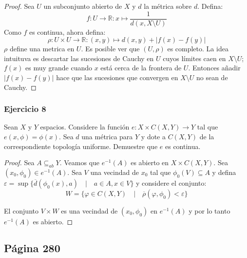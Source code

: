 \documentclass[letterpaper]{article}
\begin{document}
\begin{itemize}
\begin{proof}
Sea $U$ un subconjunto abierto de $X$ y $d$ la m\'etrica sobre $d$. Defina:
\begin{equation*}
f:U \rightarrow  \mathbb{R}:x\mapsto \frac{1}{d(x,X\setminus U)}
\end{equation*}
Como $f$ es continua, ahora defina:
\begin{equation*}
\rho : U \times U \rightarrow \mathbb{R}:(x,y)\mapsto d(x,y)+|f(x)-f(y)|
\end{equation*}
$\rho$ define una metrica en $U$.  Es posible  ver que $(U,\rho)$ es completo. La idea intuituva es descartar las sucesiones de Cauchy en $U$ cuyos l\'imites  caen en $X\setminus U$; $f(x)$ es muy grande cuando $x$ est\'a cerca de la frontera de $U$. Entonces a\~ nadir $|f(x)-f(y)|$ hace que las sucesiones que convergen en $X \setminus U$ no sean de Cauchy.
\end{proof}
\end{itemize}



\subsubsection{Ejercicio 8 }
Sean $X$ y $Y$ espacios. Considere la funci\'on $e:X\times \textit{C}(X,Y)\rightarrow Y$ tal que $e(x,\phi)=\phi(x)$. Sea $d$ una m\'etrica para $Y$ y dote a $\textit{C}(X,Y)$ de la correspondiente topolog\'ia uniforme. Demuestre que  $e$ es continua.
\begin{proof}
Sea $A \subseteq_{ab} Y$. Veamos que $e^{-1}(A)$ es abierto en $X\times \textit{C}(X,Y)$. Sea $(x_0,\phi_0)  \in e^{-1}(A)$. Sea $V$ una vecindad de $x_{0}$  tal que $\phi_{0}(V)\subseteq A$ y defina  $\varepsilon=\sup\{\overline{d}(\phi_0(x),a) \quad | \quad a \in A, x\in V\}$ y considere el conjunto:
\begin{equation*}
W=\{\varphi\in \textit{C}(X,Y)\quad|\quad \overline{\rho}(\varphi, \phi _{0})<\varepsilon \}
\end{equation*}

El conjunto $V\times W$ es una vecindad de $(x_0,\phi_0)$ en $e^{-1}(A)$ y por  lo tanto $e^{-1}(A)$ es abierto.
\end{proof}
\subsection*{P\'agina 280}
\end{document}

